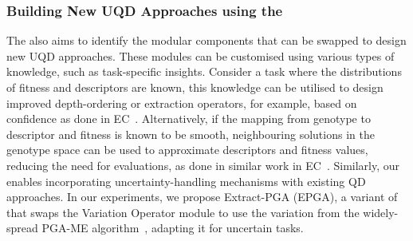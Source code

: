 \subsubsection{Building New UQD Approaches using the \framework{}}
The \framework{} also aims to identify the modular components that can be swapped to design new UQD approaches. These modules can be customised using various types of knowledge, such as task-specific insights.
Consider a task where the distributions of fitness and descriptors are known, this knowledge can be utilised to design improved depth-ordering or extraction operators, for example, based on confidence as done in EC~\cite{lecarpentier2022lucie}.
Alternatively, if the mapping from genotype to descriptor and fitness is known to be smooth, neighbouring solutions in the genotype space can be used to approximate descriptors and fitness values, reducing the need for evaluations, as done in similar work in EC~\cite{ea_archive}.
Similarly, our \framework{} enables incorporating uncertainty-handling mechanisms with existing QD approaches. 
In our experiments, we propose Extract-PGA (EPGA), a variant of \name{} that swaps the Variation Operator module to use the variation from the widely-spread PGA-ME algorithm~\cite{nilsson2021policy}, adapting it for uncertain tasks.
